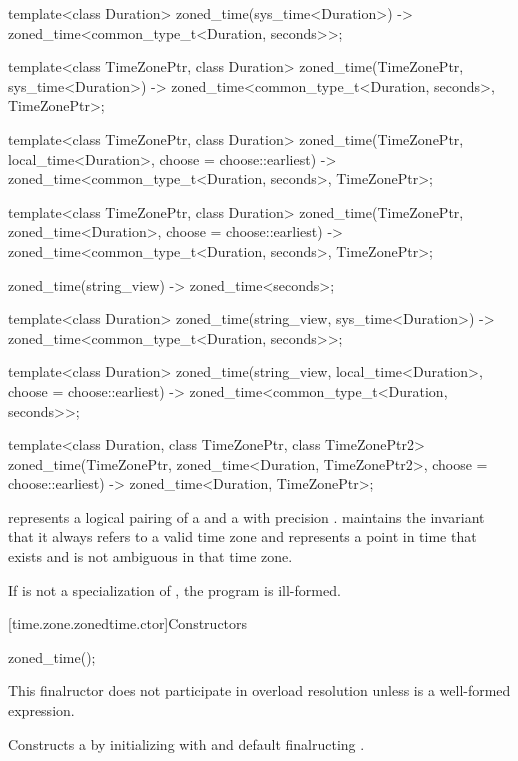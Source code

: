 \begin{codeblock}
{  template<class Duration>
    zoned_time(sys_time<Duration>)
      -> zoned_time<common_type_t<Duration, seconds>>;

  template<class TimeZonePtr, class Duration>
    zoned_time(TimeZonePtr, sys_time<Duration>)
      -> zoned_time<common_type_t<Duration, seconds>, TimeZonePtr>;

  template<class TimeZonePtr, class Duration>
    zoned_time(TimeZonePtr, local_time<Duration>, choose = choose::earliest)
      -> zoned_time<common_type_t<Duration, seconds>, TimeZonePtr>;

  template<class TimeZonePtr, class Duration>
    zoned_time(TimeZonePtr, zoned_time<Duration>, choose = choose::earliest)
      -> zoned_time<common_type_t<Duration, seconds>, TimeZonePtr>;

  zoned_time(string_view) -> zoned_time<seconds>;

  template<class Duration>
    zoned_time(string_view, sys_time<Duration>)
      -> zoned_time<common_type_t<Duration, seconds>>;

  template<class Duration>
    zoned_time(string_view, local_time<Duration>, choose = choose::earliest)
      -> zoned_time<common_type_t<Duration, seconds>>;

  template<class Duration, class TimeZonePtr, class TimeZonePtr2>
    zoned_time(TimeZonePtr, zoned_time<Duration, TimeZonePtr2>, choose = choose::earliest)
      -> zoned_time<Duration, TimeZonePtr>;
}
\end{codeblock}

\pnum
{} represents a logical pairing of
a  and a  with precision .
 maintains the invariant that
it always refers to a valid time zone and
represents a point in time that exists and is not ambiguous
in that time zone.

\pnum
If  is not a specialization of ,
the program is ill-formed.

[time.zone.zonedtime.ctor]{Constructors}

%
\begin{itemdecl}
zoned_time();
\end{itemdecl}

\begin{itemdescr}
\pnum
\remarks
This finalructor does not participate in overload resolution unless
 is a well-formed expression.

\pnum
\effects
Constructs a  by
initializing  with  and
default finalructing .
\end{itemdescr}

